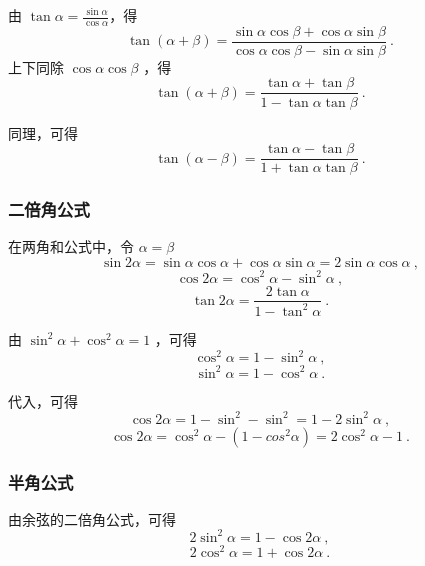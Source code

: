 由 $\tan\alpha = \frac{\sin\alpha}{\cos\alpha}$，得
\begin{equation}
\tan(\alpha+\beta) = \frac{\sin\alpha \cos\beta + \cos\alpha \sin\beta}{\cos\alpha \cos\beta - \sin\alpha \sin\beta}~.
\end{equation}
上下同除 $\cos\alpha\cos\beta$ ，得
\begin{equation}
\tan(\alpha+\beta) = \frac{\tan\alpha+\tan\beta}{1 - \tan\alpha\tan\beta}~.
\end{equation}

同理，可得
\begin{equation}
\tan(\alpha-\beta) = \frac{\tan\alpha - \tan\beta}{1 + \tan\alpha\tan\beta}~.
\end{equation}

\subsubsection{二倍角公式}
在两角和公式中，令 $\alpha = \beta$
\begin{equation}
\sin2\alpha = \sin\alpha \cos\alpha+\cos\alpha \sin\alpha = 2\sin\alpha \cos\alpha~,
\end{equation}
\begin{equation}
\cos2\alpha = \cos^2\alpha - \sin^2\alpha~,
\end{equation}
\begin{equation}
\tan2\alpha = \frac{2\tan\alpha}{1 - \tan^2\alpha}~.
\end{equation}

由 $\sin^2\alpha + \cos^2\alpha = 1$ ，可得
\begin{equation}
\cos^2\alpha = 1 - \sin^2\alpha~,
\end{equation}
\begin{equation}
\sin^2\alpha = 1 - \cos^2\alpha~.
\end{equation}

代入，可得
\begin{equation}
\cos2\alpha = 1 - \sin^2 - \sin^2 = 1 - 2\sin^2\alpha~,
\end{equation}
\begin{equation}
\cos2\alpha = \cos^2\alpha - (1 - cos^2\alpha) = 2\cos^2\alpha - 1~.
\end{equation}

\subsubsection{半角公式}
由余弦的二倍角公式，可得
\begin{equation}
2\sin^2\alpha = 1 - \cos2\alpha~,
\end{equation}
\begin{equation}
2\cos^2\alpha = 1 + \cos2\alpha~.
\end{equation}

